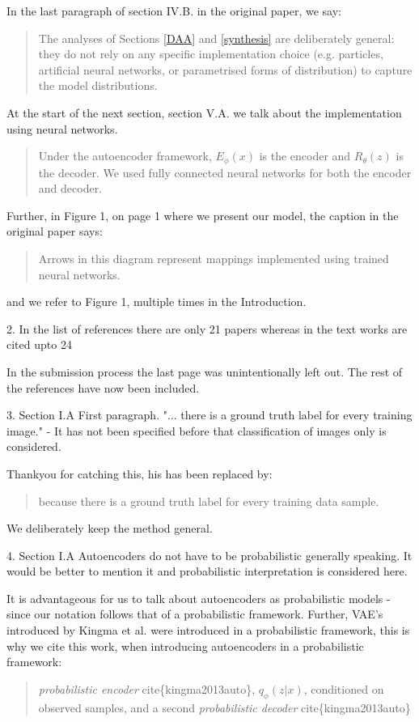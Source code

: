 \documentclass{article}
\begin{document}
    In the last paragraph of section IV.B. in the original paper, we say:
    \begin{quote}
    The analyses of Sections \ref{DAA} and \ref{synthesis} are deliberately general: they do not rely on any specific implementation choice (e.g. particles, artificial neural networks, or parametrised forms of distribution) to capture the model distributions.
    \end{quote}
At the start of the next section, section V.A. we talk about the implementation using neural networks.
\begin{quote}
    Under the autoencoder framework, $E_\phi(x)$ is the encoder and $R_\theta(z)$ is the decoder. We used fully connected neural networks for both the encoder and decoder.
\end{quote}

Further, in Figure 1, on page 1 where we present our model, the caption in the original paper says:
\begin{quote}
    Arrows in this diagram represent mappings implemented using trained neural networks.
\end{quote}
and we refer to Figure 1, multiple times in the Introduction.


{\color{blue}
2. In the list of references there are only 21 papers whereas in the text works are cited upto 24} \newline

In the submission process the last page was unintentionally left out. The rest of the references have now been included. \newline

{\color{blue}
3. Section I.A First paragraph. "... there is a ground truth label for every training image." - It has not been specified before that classification of images only is considered.} \newline

Thankyou for catching this, his has been replaced by:
\begin{quote}
    because there is a ground truth label for every training data sample.
\end{quote}
We deliberately keep the method general. \newline

{\color{blue}
4. Section I.A Autoencoders do not have to be probabilistic generally speaking. It would be better to mention it and probabilistic interpretation is considered here.}

It is advantageous for us to talk about autoencoders as probabilistic models - since our notation follows that of a probabilistic framework. Further, VAE's introduced by Kingma et al. were introduced in a probabilistic framework, this is why we cite this work, when introducing autoencoders in a probabilistic framework: 
    \begin{quote}
    \textit{probabilistic encoder} cite\{kingma2013auto\}, $q_\phi(z|x)$, conditioned on observed samples, and a second \textit{probabilistic decoder} cite\{kingma2013auto\}
    \end{quote}
\end{document}
